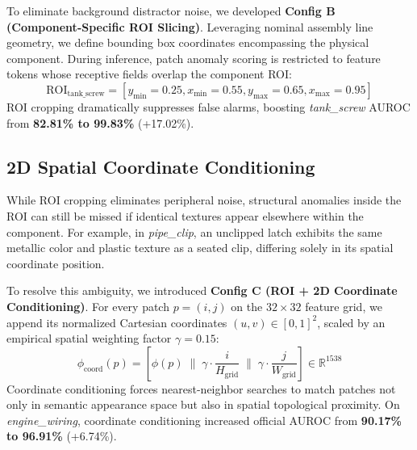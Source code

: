 \documentclass[journal,twocolumn]{IEEEtran}
\begin{document}
To eliminate background distractor noise, we developed \textbf{Config B (Component-Specific ROI Slicing)}. Leveraging nominal assembly line geometry, we define bounding box coordinates encompassing the physical component. During inference, patch anomaly scoring is restricted to feature tokens whose receptive fields overlap the component ROI:
\begin{equation}
\text{ROI}_{\text{tank\_screw}} = [y_{\min}=0.25, x_{\min}=0.55, y_{\max}=0.65, x_{\max}=0.95]
\end{equation}
ROI cropping dramatically suppresses false alarms, boosting \textit{tank\_screw} AUROC from \textbf{82.81\% to 99.83\%} (+17.02\%).

\subsection{2D Spatial Coordinate Conditioning}
While ROI cropping eliminates peripheral noise, structural anomalies inside the ROI can still be missed if identical textures appear elsewhere within the component. For example, in \textit{pipe\_clip}, an unclipped latch exhibits the same metallic color and plastic texture as a seated clip, differing solely in its spatial coordinate position.

To resolve this ambiguity, we introduced \textbf{Config C (ROI + 2D Coordinate Conditioning)}. For every patch $p = (i, j)$ on the $32 \times 32$ feature grid, we append its normalized Cartesian coordinates $(u, v) \in [0, 1]^2$, scaled by an empirical spatial weighting factor $\gamma = 0.15$:
\begin{equation}
\phi_{\text{coord}}(p) = \left[ \phi(p) \;\Big\|\; \gamma \cdot \frac{i}{H_{\text{grid}}} \;\Big\|\; \gamma \cdot \frac{j}{W_{\text{grid}}} \right] \in \mathbb{R}^{1538}
\end{equation}
Coordinate conditioning forces nearest-neighbor searches to match patches not only in semantic appearance space but also in spatial topological proximity. On \textit{engine\_wiring}, coordinate conditioning increased official AUROC from \textbf{90.17\% to 96.91\%} (+6.74\%).
\end{document}
